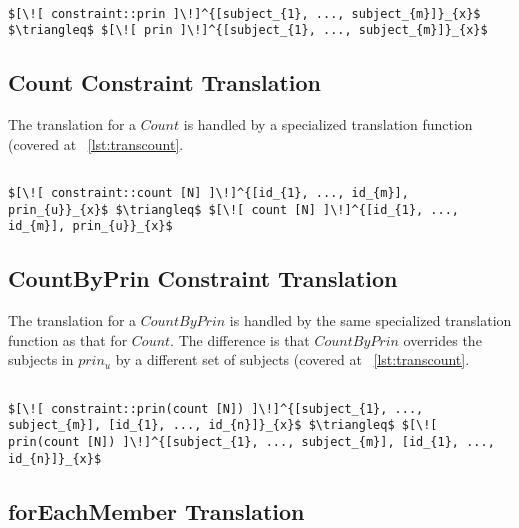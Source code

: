 \lstset{mathescape, language=AST}  
\begin{lstlisting}[frame=single, caption={Constraint Translation {$\colon$} Principal},label={lst:transconstraintPrin}]

$[\![ constraint::prin ]\!]^{[subject_{1}, ..., subject_{m}]}_{x}$ $\triangleq$ $[\![ prin ]\!]^{[subject_{1}, ..., subject_{m}]}_{x}$ 
\end{lstlisting}

\subsection{Count Constraint Translation}
The translation for a $Count$ is handled by a specialized translation function (covered at ~\ref{lst:transcount}.

\lstset{mathescape, language=AST}  
\begin{lstlisting}[frame=single, caption={Constraint Translation {$\colon$} Count},label={lst:transconstraintCount}]

$[\![ constraint::count [N] ]\!]^{[id_{1}, ..., id_{m}], prin_{u}}_{x}$ $\triangleq$ $[\![ count [N] ]\!]^{[id_{1}, ..., id_{m}], prin_{u}}_{x}$ 
\end{lstlisting}

\subsection{CountByPrin Constraint Translation}
The translation for a $CountByPrin$ is handled by the same specialized translation function as that for $Count$. The difference is that $CountByPrin$ overrides the subjects in $prin_{u}$ by a different set of subjects (covered at ~\ref{lst:transcount}.

\lstset{mathescape, language=AST}  
\begin{lstlisting}[frame=single, caption={Constraint Translation {$\colon$} Count by Principal},label={lst:transconstraintCountbyPrin}]

$[\![ constraint::prin(count [N]) ]\!]^{[subject_{1}, ..., subject_{m}], [id_{1}, ..., id_{n}]}_{x}$ $\triangleq$ $[\![ prin(count [N]) ]\!]^{[subject_{1}, ..., subject_{m}], [id_{1}, ..., id_{n}]}_{x}$ 
\end{lstlisting}


\subsection{forEachMember Translation}

